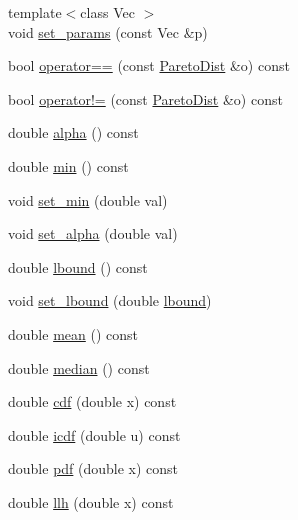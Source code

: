 \begin{DoxyCompactItemize}
\item 
{\footnotesize template$<$class Vec $>$ }\\void \hyperlink{classprior__hessian_1_1ParetoDist_a74dcc842d45232132e27ffb14feb12f1}{set\+\_\+params} (const Vec \&p)
\item 
bool \hyperlink{classprior__hessian_1_1ParetoDist_a941f8b98fe55483d7823aa33863ee050}{operator==} (const \hyperlink{classprior__hessian_1_1ParetoDist}{Pareto\+Dist} \&o) const 
\item 
bool \hyperlink{classprior__hessian_1_1ParetoDist_ae862cdfd4b588e2f97fcbaccc0decb08}{operator!=} (const \hyperlink{classprior__hessian_1_1ParetoDist}{Pareto\+Dist} \&o) const 
\item 
double \hyperlink{classprior__hessian_1_1ParetoDist_ac610ecf8ce6df7b8b48c383e89706b80}{alpha} () const 
\item 
double \hyperlink{classprior__hessian_1_1ParetoDist_acef10b17c003468838f548ed255d7e1f}{min} () const 
\item 
void \hyperlink{classprior__hessian_1_1ParetoDist_ace279cdfa7dbdcd8805ddb2ec4b46ee2}{set\+\_\+min} (double val)
\item 
void \hyperlink{classprior__hessian_1_1ParetoDist_a5c2b026477495e3fc91a1cfb653d8a97}{set\+\_\+alpha} (double val)
\item 
double \hyperlink{classprior__hessian_1_1ParetoDist_ad117226a3ad1eee827886fc7ba38acbf}{lbound} () const 
\item 
void \hyperlink{classprior__hessian_1_1ParetoDist_ac755ccef13fd2552861c27bf6c1cc29d}{set\+\_\+lbound} (double \hyperlink{classprior__hessian_1_1ParetoDist_ad117226a3ad1eee827886fc7ba38acbf}{lbound})
\item 
double \hyperlink{classprior__hessian_1_1ParetoDist_a0a1e20b0aa6c7b52c134fc2341b5fdd4}{mean} () const 
\item 
double \hyperlink{classprior__hessian_1_1ParetoDist_a74af41636088b6c727107c60dd9c81b2}{median} () const 
\item 
double \hyperlink{classprior__hessian_1_1ParetoDist_afe706cb12ce6f667e7a3a9eb7311ef65}{cdf} (double x) const 
\item 
double \hyperlink{classprior__hessian_1_1ParetoDist_a9d1040a7a5ca261feebe56f42e5698ea}{icdf} (double u) const 
\item 
double \hyperlink{classprior__hessian_1_1ParetoDist_a07cc43c2b299fc07660684f34f32d4ee}{pdf} (double x) const 
\item 
double \hyperlink{classprior__hessian_1_1ParetoDist_a0f7ee813a098cd3fc9c7669cda6a340c}{llh} (double x) const 

\end{DoxyCompactItemize}
